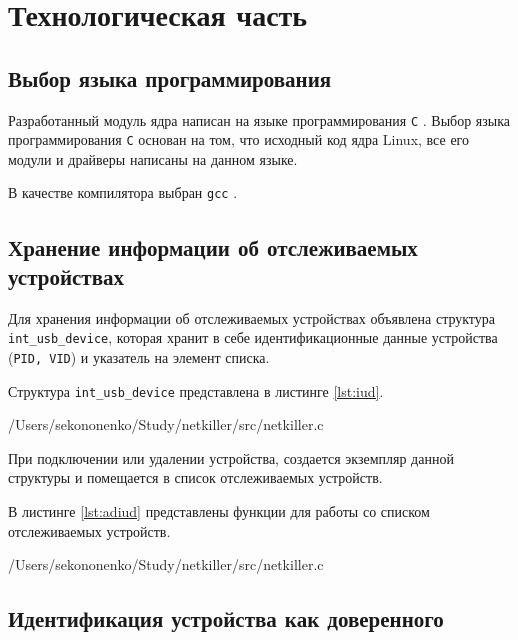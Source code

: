 \chapter{Технологическая часть}

\section{Выбор языка программирования}

Разработанный модуль ядра написан на языке программирования \texttt{C} \cite{c-language}. Выбор языка программирования \texttt{С} основан на том, что исходный код ядра Linux, все его модули и драйверы написаны на данном языке.

В качестве компилятора выбран \texttt{gcc} \cite{gcc}.

\section{Хранение информации об отслеживаемых устройствах}

Для хранения информации об отслеживаемых устройствах объявлена структура \texttt{int\_usb\_device}, которая хранит в себе идентификационные данные устройства (\texttt{PID, VID}) и указатель на элемент списка.

Структура \texttt{int\_usb\_device} представлена в листинге \ref{lst:iud}.

\begin{lstinputlisting}[
	caption={Структура \texttt{int\_usb\_device}},
	label={lst:iud},
	style={c},
	linerange={9-13},
	]{/Users/sekononenko/Study/netkiller/src/netkiller.c}
\end{lstinputlisting}

При подключении или удалении устройства, создается экземпляр данной структуры и помещается в список отслеживаемых устройств.

В листинге \ref{lst:adiud} представлены функции для работы со списком отслеживаемых устройств.

\begin{lstinputlisting}[
	caption={Функции для работы со списком отслеживаемых устройств},
	label={lst:adiud},
	style={c},
	linerange={81-102},
	]{/Users/sekononenko/Study/netkiller/src/netkiller.c}
\end{lstinputlisting}

\section{Идентификация устройства как доверенного}

